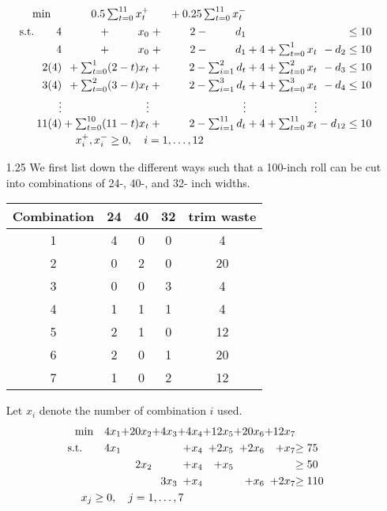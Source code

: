 \documentclass[a4paper,10pt]{article}
\theoremstyle{definition}
\begin{document}
\begin{enumerate}
\begin{align*}
  \begin{array}{r@{}r@{}r@{}r@{}r@{}r@{}r@{}r@{}r@{}l}
    \text{min} \quad&{} 0.5\sum_{t=0}^{11}x_t^+ &{} + 0.25\sum_{t=0}^{11}x_t^-&{}&{}&{} \\[\jot]
    \text{s.t.}\qquad4&{}+\phantom{\sum_{i=7}^{8}}x_0&{} +\phantom{\sum_{i=7}^{8}}2 -\phantom{\sum_{i=7}^{8}}d_1 &{}&{}&{}&{}\leq 10\\ [\jot]      
4&{}+\phantom{\sum_{i=7}^{8}}x_0&{} +\phantom{\sum_{i=7}^{8}}2-\phantom{\sum_{i=7}^{8}}d_1&{}+4&{}+\sum_{t=0}^{1}x_t&{} -d_2  &{}  \leq 10\\ [\jot]
2(4)&{}+\sum_{t=0}^{1}(2-t)x_t&{} +\phantom{\sum_{i=7}^{8}}2-\sum_{i=1}^{2}d_t&{}+4&{}+\sum_{t=0}^{2}x_t&{} -d_3&{}    \leq 10\\ [\jot]
3(4)&{}+\sum_{t=0}^{2}(3-t)x_t&{} +\phantom{\sum_{i=7}^{8}}2-\sum_{i=1}^{3}d_t&{}+4&{}+\sum_{t=0}^{3}x_t&{} -d_4&{}    \leq 10\\ [\jot]
\vdots&{}\vdots&{}\vdots&{}&{}\vdots&{}&{}&{}&{}&{}\\
11(4)&{}+\sum_{t=0}^{10}(11-t)x_t&{} +\phantom{\sum_{i=7}^{8}}2-\sum_{i=1}^{11}d_t&{}+4&{}+\sum_{t=0}^{11}x_t&{} -d_{12}&{}    \leq 10\\ [\jot]
 \multicolumn{4}{c}{x_i^+, x_i^- \geq 0, \quad i=1,\ldots,12}
  \end{array}
\end{align*}
\item[1.25]
We first list down the different ways such that a 100-inch roll can be cut into combinations of 24-, 40-, and 32- inch widths.
\begin{table}[h]
\centering
\begin{tabular}{c|c|c|c|c}
\hline
Combination&24 &40 & 32 & trim waste\\
\hline
1&4 &0 &0 & 4\\
 2&0 &2 & 0& 20\\
 3& 0 & 0& 3& 4\\
4&   1 &1 &1 &4 \\
 5&   2 &1 & 0& 12\\
  6&   2 &0 &1 & 20\\
   7&    1  &0 &2 & 12\\
       \hline
\end{tabular}
\end{table}
Let $x_i$ denote the number of combination $i$ used.
\begin{align*}
  \begin{array}{r@{}r@{}r@{}r@{}r@{}r@{}r@{}l}
    \text{min} \quad 4x_1 &+ 20x_2&+ 4x_3&+ 4x_4&+ 12x_5&+ 20x_6&+ 12x_7 \\[\jot]
    \text{s.t.}\qquad  4x_1 & & & +x_4 & +2x_5&+2x_6&+x_7  & \geq 75\\[\jot]
    & 2x_2& & +x_4 & +x_5&& & \geq 50\\[\jot]
    & & 3x_3& +x_4 & &+x_6&+2x_7  & \geq 110\\[\jot]
 \multicolumn{4}{c}{x_j \geq 0, \quad j=1,\ldots,7}
  \end{array}
\end{align*}


\end{enumerate}
\end{document}
